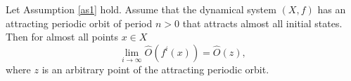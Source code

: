 \documentclass[format=acmsmall, authorversion, screen=true]{acmart}
\def\R{\ensuremath{\mathbb{R}}}
\begin{document}

\begin{proposition}\label{averages2}
Let Assumption \ref{as1} hold. Assume that the dynamical system $(X,f)$ has an attracting periodic orbit of period $n > 0$ that attracts almost all initial states.
Then for almost all points $x \in X$
\[
\lim_{i\rightarrow \infty} \hat{O}(f^i(x)) = \hat{O}(z),
\]
where $z$ is an arbitrary point of the attracting periodic orbit.
\end{proposition}
\end{document}
